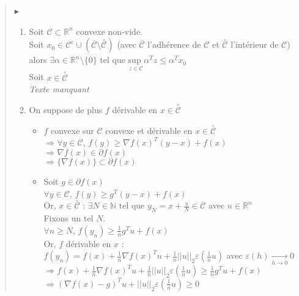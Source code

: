\documentclass[12pt,a4paper]{article}
\newcommand{\preuve}[1]{%
    \begin{quote}
        $\blacktriangleright$~#1
    \end{quote}
}
\begin{document}
\preuve{
    \begin{enumerate}[label=\roman*)]
        \item Soit $\mathcal{C} \subset \mathbb{R}^n$ convexe non-vide.\\
        Soit $x_0 \in \mathcal{C}^c \cup (\overset{\_}{\mathcal{C}} \text{\textbackslash } \overset{\circ}{\mathcal{C}})$
        (avec $\overset{\_}{\mathcal{C}}$ l'adhérence de $\mathcal{C}$ et $\overset{\circ}{\mathcal{C}}$ l'intérieur de $\mathcal{C}$)\\
        alors $\exists \alpha \in \mathbb{R}^n \text{\textbackslash} \{0\}$ tel que $\underset{z \in \mathcal{C}}{\text{sup }} \alpha^T z \leq \alpha^T x_0$\\
    
        Soit $x \in \overset{\circ}{\mathcal{C}}$\\
    
        \textit{Texte manquant}\\
    
    
        \item On suppose de plus $f$ dérivable en $x \in \overset{\circ}{\mathcal{C}}$
        \begin{itemize}
            \item $f$ convexe sur $\mathcal{C}$ convexe et dérivable en $x \in \overset{\circ}{\mathcal{C}}$\\
            $\Rightarrow \forall y \in \mathcal{C}$, $f(y) \geq \nabla f(x)^T(y - x) + f(x)$\\
            $\Rightarrow \nabla f(x) \in \partial f(x)$\\
            $\Rightarrow \{\nabla f(x) \} \subset \partial f(x)$\\
    
            \item Soit $g \in \partial f(x)$\\
            $\forall y \in \mathcal{C}$, $f(y) \geq g^T(y - x) + f(x)$\\
            Or, $x \in \overset{\circ}{\mathcal{C}}$ : $\exists N \in \mathbb{N} \text{ tel que } y_N = x + \frac{u}{N} \in \mathcal{C}$ avec $u \in \mathbb{R}^n$\\
    
            Fixons un tel $N$.\\
            $\forall n \geq N$, $f(y_n) \geq \frac{1}{n} g^T u + f(x)$\\
    
            Or, $f$ dérivable en $x$ :\\
            $f(y_n) = f(x) + \frac{1}{n} \nabla f(x)^T u + \frac{1}{n} ||u||_2 \varepsilon(\frac{1}{n}u)$ avec $\varepsilon(h) \xrightarrow[h \rightarrow 0]{} 0$\\
            $\Rightarrow f(x) + \frac{1}{n} \nabla f(x)^T u + \frac{1}{n} ||u||_2 \varepsilon(\frac{1}{n}u) \geq \frac{1}{n} g^T u + f(x)$\\
            $\Rightarrow (\nabla f(x) - g)^T u + ||u||_2 \varepsilon(\frac{1}{n}u) \geq 0$\\
            

\end{itemize}
\end{enumerate}}
\end{document}
